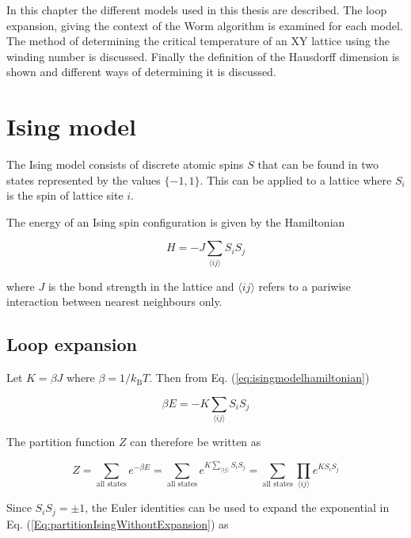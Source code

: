 In this chapter the different models used in this thesis are described. The loop expansion, giving the context of the Worm algorithm is examined for each model. The method of determining the critical temperature of an XY lattice using the winding number is discussed. Finally the definition of the Hausdorff dimension is shown and different ways of determining it is discussed.

\section{Ising model}

The Ising model consists of discrete atomic spins $S$ that can be found in two states represented by the values $\{-1, 1\}$. This can be applied to a lattice where $S_i$ is the spin of lattice site $i$.

The energy of an Ising spin configuration is given by the Hamiltonian

\begin{equation}
    H = - J \sum_{\langle ij \rangle} S_i S_j
\label{eq:isingmodelhamiltonian}
\end{equation}

\noindent where $J$ is the bond strength in the lattice and $\langle ij \rangle$ refers to a pariwise interaction between nearest neighbours only.

\subsection{Loop expansion}
\label{subsec:IsingLoopExpansion}

Let $K = \beta J$ where $\beta = 1/k_{\text{B}} T$. Then from Eq. (\ref{eq:isingmodelhamiltonian})

\begin{equation}
    \beta E = - K \sum_{\langle ij \rangle} S_i S_j
\end{equation}

The partition function $Z$ can therefore be written as

\begin{equation}
    Z = \sum_{\text{all states}} e^{-\beta E} = \sum_{\text{all states}} e^{K \sum_{\langle ij \rangle} S_i S_j} = \sum_{\text{all states}} \prod_{\langle ij \rangle} e^{K S_i S_j}
\label{Eq:partitionIsingWithoutExpansion}
\end{equation}

Since $S_i S_j = \pm 1$, the Euler identities can be used to expand the exponential in Eq. (\ref{Eq:partitionIsingWithoutExpansion}) as

